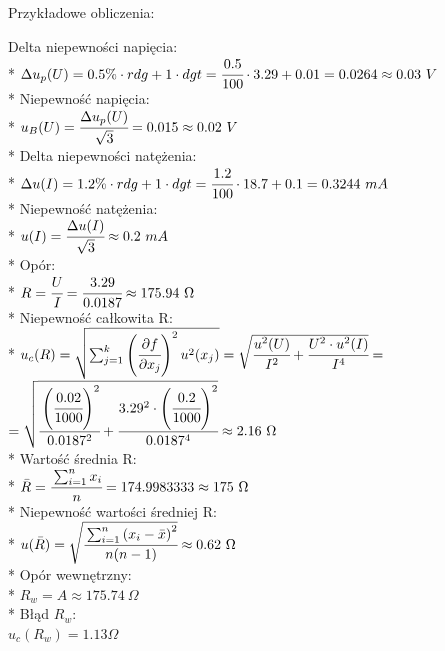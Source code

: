 \documentclass{article}
\begin{document}
\begin{center}
    \begin{flushleft}
        Przykładowe obliczenia:\\
    \end{flushleft}
    Delta niepewności napięcia:\\*
    $\Delta u_p (U)  = 0.5\% \cdot rdg+1 \cdot dgt=\cfrac{0.5}{100} \cdot 3.29 + 0.01=0.0264\approx0.03 \ V$\\*
    Niepewność napięcia:\\*
    $u_B (U)=\cfrac{\Delta u_p(U)}{\sqrt{3}}=0.015\approx0.02 \ V$\\*
    Delta niepewności natężenia:\\* 
    $\Delta u(I) = 1.2\% \cdot rdg+1 \cdot dgt = \cfrac{1.2}{100} \cdot 18.7 +0.1 =0.3244 \ mA$\\*
    Niepewność natężenia:\\*
    $u(I)= \cfrac{\Delta u(I)}{\sqrt{3}} \approx 0.2 \ mA$\\*
    Opór:\\* 
    $R=\cfrac{U}{I} = \cfrac{3.29}{0.0187} \approx 175.94 \ \Omega$\\*
    Niepewność całkowita R:\\*
    $u_c (R)=\sqrt{\sum_{j=1}^{k}\left( \cfrac{\partial f}{\partial x_j}\right)^2 u^2 (x_j)}
    =\sqrt{\cfrac{u^2 (U)}{I^2} + \cfrac{U^2 \cdot u^2 (I)}{I^4}}=$
    $= \sqrt{\cfrac{\left(\cfrac{0.02}{1000}\right)^2}{0.0187^2} + \cfrac{3.29^2 \cdot \left(\cfrac{0.2}{1000}\right)^2}{0.0187^4}}\approx 2.16 \ \Omega$\\* 
    Wartość średnia R:\\* 
    $\bar{R} = \cfrac{\sum_{i=1}^{n}x_i}{n}=174.9983333 \approx 175 \ \Omega$\\*
    Niepewność wartości średniej R:\\*
    $u(\bar{R}) = \sqrt{\cfrac{\sum_{i=1}^{n} \left(x_i - \bar{x} \right)^2}{n(n-1)}}\approx 0.62 \ \Omega$\\*
    Opór wewnętrzny:\\* 
    $R_w =A\approx 175.74 \ \Omega$\\*
    Błąd $R_w$:\\
    $u_c (R_w) = 1.13 \Omega$\\

\end{center}
\newpage
\end{document}
